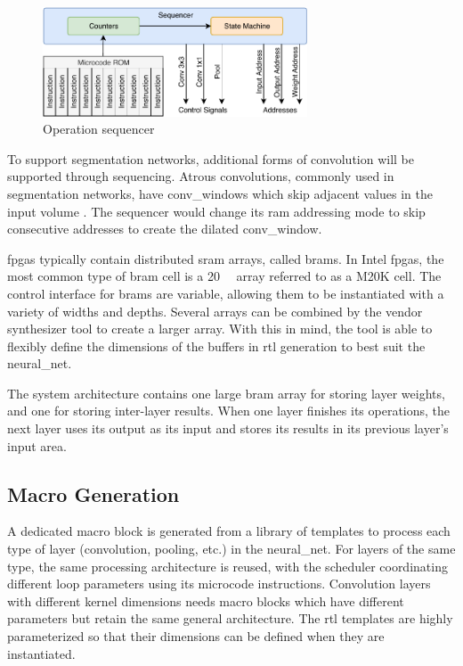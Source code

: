 \documentclass{uw-ece-wkrpt}
\begin{document}
\begin{figure}
\centering
\includegraphics[width=0.7\textwidth]{figures/sequencer}
\caption{Operation sequencer}\label{fig:sequencer}
\end{figure}

To support segmentation networks, additional forms of convolution will be supported through sequencing. Atrous convolutions, commonly used in segmentation networks, have \glspl{conv_window} which skip adjacent values in the input volume \cite{Chen2018DeepLab:-Semant}. The sequencer would change its \gls{ram} addressing mode to skip consecutive addresses to create the dilated \gls{conv_window}.

\glspl{fpga} typically contain distributed \gls{sram} arrays, called \glspl{bram}. In Intel \glspl{fpga}, the most common type of \gls{bram} cell is a \SI{20}{\kilo\bit} array referred to as a M20K cell. The control interface for \glspl{bram} are variable, allowing them to be instantiated with a variety of widths and depths. Several arrays can be combined by the vendor synthesizer tool to create a larger array. With this in mind, the tool is able to flexibly define the dimensions of the buffers in \gls{rtl} generation to best suit the \gls{neural_net}.

The system architecture contains one large \gls{bram} array for storing layer weights, and one for storing inter-layer results. When one layer finishes its operations, the next layer uses its output as its input and stores its results in its previous layer's input area.

\subsection{Macro Generation}\label{sec:macro_gen}

A dedicated macro block is generated from a library of templates to process each type of layer (convolution, pooling, etc.) in the \gls{neural_net}. For layers of the same type, the same processing architecture is reused, with the scheduler coordinating different loop parameters using its microcode instructions. Convolution layers with different \gls{kernel} dimensions needs macro blocks which have different parameters but retain the same general architecture. The \gls{rtl} templates are highly parameterized so that their dimensions can be defined when they are instantiated.
\end{document}
